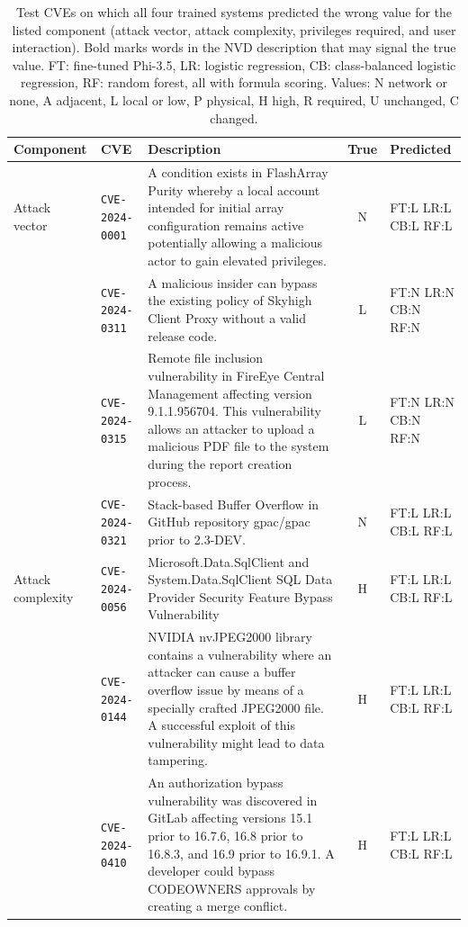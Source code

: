 \begin{table}[p]
\centering
\caption{Test CVEs on which all four trained systems predicted the wrong value for the listed component (attack vector, attack complexity, privileges required, and user interaction). Bold marks words in the NVD description that may signal the true value. FT: fine-tuned Phi-3.5, LR: logistic regression, CB: class-balanced logistic regression, RF: random forest, all with formula scoring. Values: N network or none, A adjacent, L local or low, P physical, H high, R required, U unchanged, C changed.}
\label{tab:qualalla}
\scriptsize
\setlength{\tabcolsep}{3pt}
\begin{tabular}{@{}llp{6.2cm}cl@{}}
\toprule
Component & CVE & Description & True & Predicted \\
\midrule
Attack vector & \texttt{CVE-2024-0001} & A condition exists in FlashArray Purity whereby a local account intended for initial array configuration remains active potentially allowing a malicious actor to gain elevated privileges. & N & FT:L LR:L CB:L RF:L \\
 & \texttt{CVE-2024-0311} & A malicious insider can bypass the existing policy of Skyhigh Client Proxy without a valid release code. & L & FT:N LR:N CB:N RF:N \\
 & \texttt{CVE-2024-0315} & Remote file inclusion vulnerability in FireEye Central Management affecting version 9.1.1.956704. This vulnerability allows an attacker to upload a malicious PDF file to the system during the report creation process. & L & FT:N LR:N CB:N RF:N \\
 & \texttt{CVE-2024-0321} & Stack-based Buffer Overflow in GitHub repository gpac/gpac prior to 2.3-DEV. & N & FT:L LR:L CB:L RF:L \\
\addlinespace[3pt]
Attack complexity & \texttt{CVE-2024-0056} & Microsoft.Data.SqlClient and System.Data.SqlClient SQL Data Provider Security Feature Bypass Vulnerability & H & FT:L LR:L CB:L RF:L \\
 & \texttt{CVE-2024-0144} & NVIDIA nvJPEG2000 library contains a vulnerability where an attacker can cause a buffer overflow issue by means of a specially crafted JPEG2000 file. A successful exploit of this vulnerability might lead to data tampering. & H & FT:L LR:L CB:L RF:L \\
 & \texttt{CVE-2024-0410} & An authorization bypass vulnerability was discovered in GitLab affecting versions 15.1 prior to 16.7.6, 16.8 prior to 16.8.3, and 16.9 prior to 16.9.1. A developer could bypass CODEOWNERS approvals by creating a merge conflict. & H & FT:L LR:L CB:L RF:L \\

\end{tabular}
\end{table}

